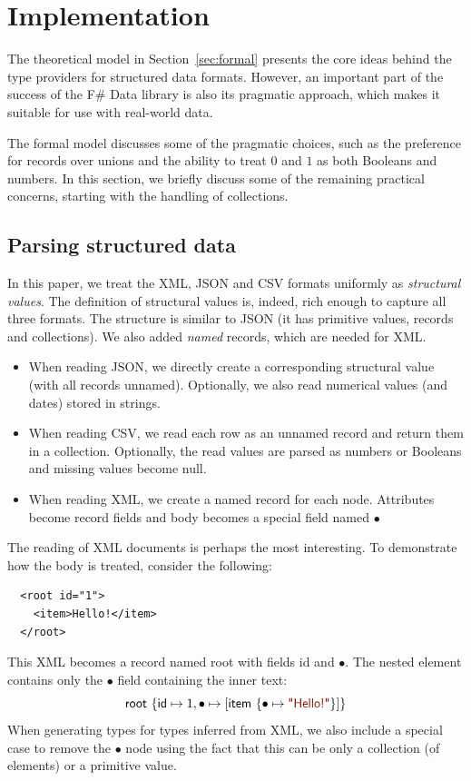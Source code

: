 \documentclass[10pt,preprint,clearpagebib]{sigplanconf}
\newcommand{\kvd}[1]{\textnormal{\textcolor{kvdclr}{\sffamily #1}}}
\newcommand{\str}[1]{\textnormal{\textcolor{strclr}{\sffamily "#1"}}}
\newcommand{\ident}[1]{\textnormal{\sffamily #1}}
\begin{document}
\section{Implementation}
\label{sec:impl}

The theoretical model in Section~\ref{sec:formal} presents the core ideas behind the type 
providers for structured data formats. However, an important part of the success of the F\# Data
library is also its pragmatic approach, which makes it suitable for use with real-world data.

The formal model discusses some of the pragmatic choices, such as the preference for records over 
unions and the ability to treat $0$ and $1$ as both Booleans and numbers. In this section, we briefly
discuss some of the remaining practical concerns, starting with the handling of collections.


\subsection{Parsing structured data}
\label{sec:impl-parsing}

In this paper, we treat the XML, JSON and CSV formats uniformly as \emph{structural values}.
The definition of structural values is, indeed, rich enough to capture all three formats. The
structure is similar to JSON (it has primitive values, records and collections). We also added
\emph{named} records, which are needed for XML.
%
\begin{itemize}
\item When reading JSON, we directly create a corresponding structural value (with all records unnamed).
  Optionally, we also read numerical values (and dates) stored in strings.
\item When reading CSV, we read each row as an unnamed record and return them in a collection.
  Optionally, the read values are parsed as numbers or Booleans and missing values become \kvd{null}.
\item When reading XML, we create a named record for each node. Attributes become record fields and
  body becomes a special field named $\bullet$
\end{itemize}
%
The reading of XML documents is perhaps the most interesting. To demonstrate how the body is treated,
consider the following:
%
{\small{
\begin{verbatim}
  <root id="1">
    <item>Hello!</item>
  </root>    
\end{verbatim}
}}
%
\noindent
This XML becomes a record named \ident{root} with fields \ident{id} and $\bullet$. The nested element
contains only the $\bullet$ field containing the inner text:
%
\begin{equation*}
\ident{root}~\{ \ident{id} \mapsto 1, \bullet \mapsto [ \ident{item}~\{ \bullet \mapsto \str{Hello!} \}] \}
\end{equation*}
%
When generating types for types inferred from XML, we also include a special case to remove the $\bullet$
node using the fact that this can be only a collection (of elements) or a primitive value.
\end{document}

